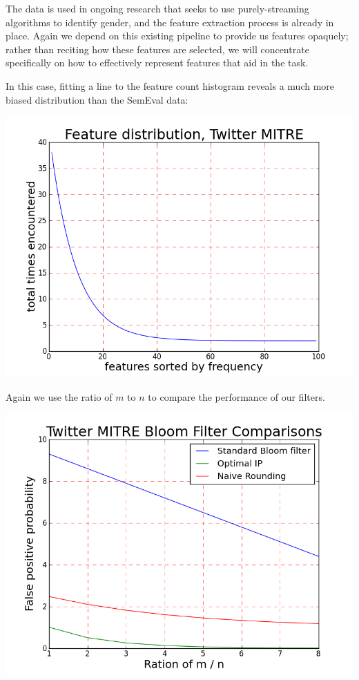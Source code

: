 \documentclass[11pt]{article}
\begin{document}
The data is used in ongoing research that seeks to use purely-streaming algorithms to identify gender, and the feature extraction process is already in place. Again we depend on this existing pipeline to provide us features opaquely; rather than reciting how these features are selected, we will concentrate specifically on how to effectively represent features that aid in the task.

In this case, fitting a line to the feature count histogram reveals a much more biased distribution than the SemEval data:

\begin{center}
\includegraphics[scale=0.25]{dist2.png}
\end{center}

Again we use the ratio of $m$ to $n$ to compare the performance of our filters.

\begin{center}
\includegraphics[scale=0.25]{resultst.png}
\end{center}
\end{document}
